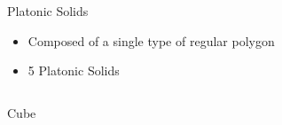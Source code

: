 \documentclass{beamer}
\begin{document}
\begin{frame}{Platonic Solids}
\begin{itemize}
  \item Composed of a single type of regular polygon
  \item 5 Platonic Solids
\end{itemize}
\vspace{0.1 in}
\begin{columns}
    \begin{column}{0.32\textwidth}
      \centering


      Cube
     \end{column}
    \begin{column}{0.32\textwidth}
      \centering
      

\end{column}
\end{columns}
\end{frame}
\end{document}
